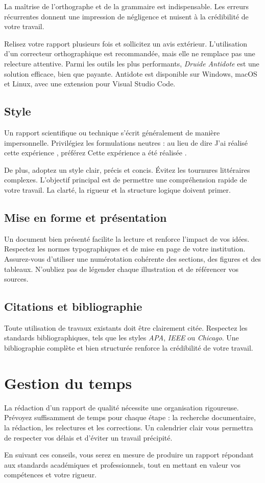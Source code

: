 La maîtrise de l'orthographe et de la grammaire est indispensable. Les erreurs récurrentes donnent une impression de négligence et nuisent à la crédibilité de votre travail.

Relisez votre rapport plusieurs fois et sollicitez un avis extérieur. L'utilisation d'un correcteur orthographique est recommandée, mais elle ne remplace pas une relecture attentive. Parmi les outils les plus performants, \textit{Druide Antidote} est une solution efficace, bien que payante. Antidote est disponible sur Windows, macOS et Linux, avec une extension pour Visual Studio Code.

\subsection{Style}

Un rapport scientifique ou technique s'écrit généralement de manière impersonnelle. Privilégiez les formulations neutres : au lieu de dire \og J'ai réalisé cette expérience \fg, préférez \og Cette expérience a été réalisée \fg.

De plus, adoptez un style clair, précis et concis. Évitez les tournures littéraires complexes. L'objectif principal est de permettre une compréhension rapide de votre travail. La clarté, la rigueur et la structure logique doivent primer.

\subsection{Mise en forme et présentation}

Un document bien présenté facilite la lecture et renforce l'impact de vos idées. Respectez les normes typographiques et de mise en page de votre institution. Assurez-vous d'utiliser une numérotation cohérente des sections, des figures et des tableaux. N'oubliez pas de légender chaque illustration et de référencer vos sources.

\subsection{Citations et bibliographie}

Toute utilisation de travaux existants doit être clairement citée. Respectez les standards bibliographiques, tels que les styles \textit{APA}, \textit{IEEE} ou \textit{Chicago}. Une bibliographie complète et bien structurée renforce la crédibilité de votre travail.

\section{Gestion du temps}

La rédaction d'un rapport de qualité nécessite une organisation rigoureuse. Prévoyez suffisamment de temps pour chaque étape : la recherche documentaire, la rédaction, les relectures et les corrections. Un calendrier clair vous permettra de respecter vos délais et d'éviter un travail précipité.

En suivant ces conseils, vous serez en mesure de produire un rapport répondant aux standards académiques et professionnels, tout en mettant en valeur vos compétences et votre rigueur.